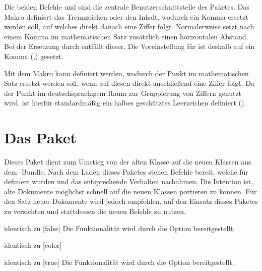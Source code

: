 \documentclass[%
  english,ngerman,%
  headings=optiontoheadandtoc,captions=tableheading,numbers=noenddot,%
  chapterpage,cdfoot,%
]{tudscrman}
\begin{document}
\begin{Declaration}{}
\begin{Declaration}{}
\printdeclarationlist%
Die beiden Befehle  und  sind die zentrale 
Benutzerschnittstelle des Paketes. Das Makro  definiert das 
Trennzeichen oder den Inhalt, wodurch ein Komma ersetzt werden soll, auf 
welches direkt danach eine Ziffer folgt. Normalerweise setzt 
nach einem Komma im mathematischen Satz zusätzlich einen horizontalen Abstand.
Bei der Ersetzung durch  entfällt dieser. Die Voreinstellung
für  ist deshalb auf ein Komma (,) gesetzt.

Mit dem Makro  kann definiert werden, wodurch der Punkt im 
mathematischen Satz ersetzt werden soll, wenn auf diesen direkt anschließend 
eine Ziffer folgt. Da der Punkt im deutschsprachigem Raum zur Gruppierung von
Ziffern genutzt wird, ist hierfür standardmäßig ein halbes geschütztes
Leerzeichen definiert (\Macro*{,}).
\end{Declaration}
\end{Declaration}


\section{Das Paket }
Dieses Paket dient zum Umstieg von der alten Klasse  auf die 
neuen Klassen aus dem \TUDScript-Bundle. Nach dem Laden dieses Paketes stehen 
Befehle bereit, welche für  definiert wurden und das 
entsprechende Verhalten nachahmen. Die Intention ist, alte Dokumente möglichst 
schnell auf die neuen Klassen portieren zu können. Für den Satz neuer Dokumente 
wird jedoch empfohlen, auf den Einsatz dieses Paketes zu verzichten und 
stattdessen die neuen Befehle zu nutzen.

\begin{Declaration}{}{%
  identisch zu [false]%
}
\printdeclarationlist%
Die Funktionalität wird durch die Option  bereitgestellt.
\end{Declaration}

\begin{Declaration}{}{%
  identisch zu [color]%
}
\begin{Declaration}{}{%
  identisch zu [true]%
}
\printdeclarationlist%
Die Funktionalität wird durch die Option  bereitgestellt.
\end{Declaration}
\end{Declaration}
\end{document}
